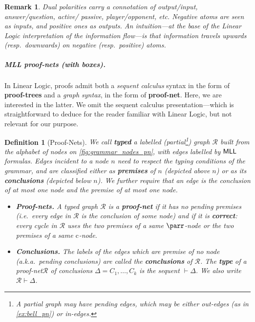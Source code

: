\documentclass[10pt,a4paper]{article}
\newcommand*{\resp}{resp.}
\newcommand*{\ie}{\emph{i.e.}\xspace}
\newcommand*{\aka}{\emph{a.k.a.}}
\newcommand{\textdef}[1]{\textbf{#1}}
\newcommand*{\definitive}[1]{\textbf{#1}}
\newcommand{\der}{\vdash}
\newcommand{\MLL}{\ensuremath{\mathsf{MLL}}\xspace}
\newcommand*{\logsys}[1]{\textnormal{\textsf{#1}}}
\renewcommand*{\MLL}{\ensuremath{\logsys{MLL}}\xspace}
\newcommand*{\somepn}{\mathcal{R}}
\newcommand*{\somenode}{n}
\newcommand*{\cc}[1][]{\mathrm{c}_{#1}}
\newcommand{\pn}{proof-net\xspace}
\newcommand{\pts}{proof-trees\xspace}
\newtheorem{definition}[theorem]{Definition}
\newtheorem{remark}[theorem]{Remark}
\begin{document}
\begin{remark}\label{rem:polarity}
Dual polarities carry a connotation of output/input, answer/question, active/ passive, player/opponent, etc.
Negative atoms are seen as \emph{inputs}, and positive ones as \emph{outputs}.
An intuition---at the base of the Linear Logic interpretation of the information flow---is that information travels upwards (\resp\ downwards) on negative (\resp\ positive) atoms.
\end{remark}

\subparagraph{MLL proof-nets (with boxes).}

In Linear Logic, proofs admit both a \emph{sequent calculus} syntax in the form of \textdef{\pts} and a \emph{graph syntax}, in the form of \textdef{\pn}.
Here, we are interested in the latter.
We omit the sequent calculus presentation---which is straightforward to deduce for the reader familiar with Linear Logic, but not relevant for our purpose.

\begin{definition}[Proof-Nets]
\label{def:pn}
We call \textbf{typed} a labelled (partial\footnote{A partial graph may have \emph{pending edges}, which may be either out-edges (as in \cref{ex:bell_pn}) or in-edges.}) graph $\somepn$ built from the alphabet of nodes on \cref{fig:grammar_nodes_pn}, with edges labelled by \MLL formulas.
Edges incident to a node $\somenode$ need to respect the typing conditions of the grammar, and are classified either as \definitive{premises} of $\somenode$ (depicted above $\somenode$) or as its \definitive{conclusions} (depicted below $\somenode$).
We further require that an edge is the conclusion of at most one node and the premise of at most one node.
\begin{itemize}
\item
\textbf{Proof-nets.}
A typed graph $\somepn$ is a \definitive{proof-net} if it has no pending premises (\ie\ every edge in $\somepn$ is the conclusion of some node) and if it is \definitive{correct}:
every cycle in $\somepn$ uses the two premises of a same $\parr$-node or the two premises of a same $\cc$-node.
\item
\textbf{Conclusions.}
The labels of the edges which are premise of no node (\aka\ pending conclusions) are called the \definitive{conclusions} of $\somepn$.
The \definitive{type} of a \pn $\somepn$ of conclusions $\Delta=C_1, \dots, C_k$ is the sequent $\vdash \Delta$.
We also write $\somepn \der \Delta$.
\end{itemize}
\end{definition}
\end{document}
